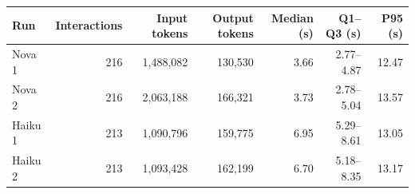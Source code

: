 \begin{tabularx}{\textwidth}{@{}Xrrrrrr@{}}
\toprule
\textbf{Run} & \textbf{Interactions} & \textbf{Input tokens} & \textbf{Output tokens} & \textbf{Median (s)} & \textbf{Q1--Q3 (s)} & \textbf{P95 (s)} \\
\midrule
Nova 1 & 216 & 1,488,082 & 130,530 & 3.66 & 2.77--4.87 & 12.47 \\
Nova 2 & 216 & 2,063,188 & 166,321 & 3.73 & 2.78--5.04 & 13.57 \\
Haiku 1 & 213 & 1,090,796 & 159,775 & 6.95 & 5.29--8.61 & 13.05 \\
Haiku 2 & 213 & 1,093,428 & 162,199 & 6.70 & 5.18--8.35 & 13.17 \\
\bottomrule
\end{tabularx}
